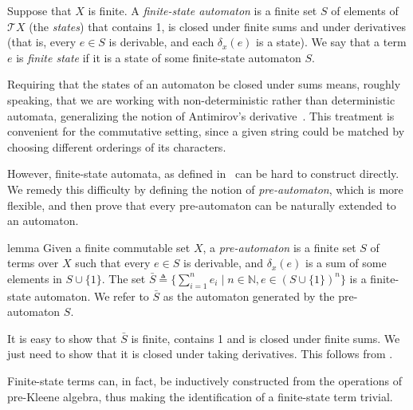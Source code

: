 \documentclass[a4paper,UKenglish,cleveref, autoref, thm-restate]{lipics-v2021}
\begin{document}
\begin{definition}
  \label{def:finite-state}
  Suppose that $X$ is finite.  A \emph{finite-state automaton} is a finite set
  $S$ of elements of $\mathcal{T}X$ (the \emph{states}) that contains 1, is
  closed under finite sums and under derivatives (that is, every $e \in S$ is
  derivable, and each $ \delta _x(e)$ is a state).  We say that a term $e$ is
  \emph{finite state} if it is a state of some finite-state automaton $S$.
\end{definition}

Requiring that the states of an automaton be closed under sums means, roughly
speaking, that we are working with non-deterministic rather than deterministic
automata, generalizing the notion of Antimirov's derivative~\cite{antimirov_PartialDerivativesRegular_1996}.
This treatment is convenient for the commutative setting, since a given string
could be matched by choosing different orderings of its characters.

\iffull%
However, finite-state automata, as defined in~
can be hard to construct directly. We remedy this difficulty
by defining the notion of \emph{pre-automaton}, which is more flexible,
and then prove that every pre-automaton can be naturally extended to an automaton.

\begin{theoremEnd}{lemma}
  \label{lem:generated-automaton}
  Given a finite commutable set \(X\), a \emph{pre-automaton} is a finite set $S$ of
  terms over $X$ such that every $e  \in  S$ is derivable, and $ \delta _x(e)$ is a sum of
  some elements in $S  \cup  \{1\}$.  The set
  $\bar{S}  \triangleq  \{ \sum _{i = 1}^n e_i  \mid  n  \in  \mathbb{N}, e  \in  (S  \cup  \{1\})^n\}$ is a finite-state
  automaton.  We refer to $\bar{S}$ as the automaton generated by the
  pre-automaton $S$.
\end{theoremEnd}

\begin{proofEnd}
  It is easy to show that $\bar{S}$ is finite, contains 1 and is closed under
  finite sums.  We just need to show that it is closed under taking derivatives.
  This follows from .
\end{proofEnd}
\fi

Finite-state terms can, in fact, be inductively constructed from the operations
of pre-Kleene algebra, thus making the identification of a finite-state term
trivial.
\end{document}
